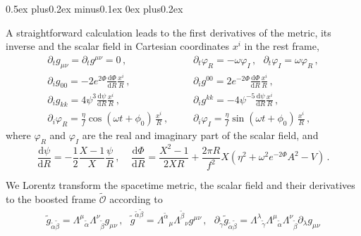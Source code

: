 \documentclass[]{iopart}
\newcommand{\du}{\mathrm{d}}
\begin{document}
\begin{list}{\rm{\bf ()}}{
                
             \parsep0.5ex plus0.2ex minus0.1ex \itemsep0ex plus0.2ex}
  \item A straightforward calculation leads to the first derivatives
  of the metric, its inverse and the scalar field in Cartesian
  coordinates $x^i$ in the rest frame,
  \begin{eqnarray}
    \partial_t g_{\mu\nu}=\partial_t g^{\mu\nu}=0\,,~~~&&
    \partial_t \varphi_R = -\omega \varphi_I\,,~~~
    \partial_t \varphi_I = \omega \varphi_R\,,
    \nonumber \\[5pt]
    \partial_i g_{00} = -2e^{2\Phi}\frac{\du \Phi}{\du R} \frac{x^i}{R}\,,
    ~~~~~&&
    \partial_i g^{00} = 2e^{-2\Phi} \frac{\du \Phi}{\du R}\frac{x^i}{R}\,,
    \nonumber \\[5pt]
    \partial_i g_{kk} = 4\psi^3 \frac{\du \psi}{\du R} \frac{x^i}{R}\,,
    && \partial_i g^{kk} = -4\psi^{-5} \frac{\du \psi}{\du R}
          \frac{x^i}{R}\,,
    \nonumber \\[5pt]
    \partial_i \varphi_R = \frac{\eta}{f} \cos(\omega t + \phi_0)\,
        \frac{x^i}{R}\,,~~~~&&
  \partial_i \varphi_I = \frac{\eta}{f} \sin(\omega t + \phi_0)\,
        \frac{x^i}{R}\,,
  \end{eqnarray}
  where $\varphi_R$ and $\varphi_I$ are the real and imaginary part
  of the scalar field, and
  \begin{equation}
    \frac{\du \psi}{\du R} = -\frac{1}{2}
        \frac{X-1}{X} \frac{\psi}{R}\,,~~~~~
        \displaystyle \frac{\du \Phi}{\du R}=
        \frac{X^2-1}{2XR}+\frac{2\pi R}{f^2}X(\eta^2+\omega^2
        e^{-2\Phi}A^2-V)\,.
  \end{equation}
  \item We Lorentz transform the spacetime metric, the scalar field
  and their derivatives to the boosted frame $\tilde{\mathcal{O}}$
  according to
  \begin{gather}
    \tilde{g}_{\tilde{\alpha}\tilde{\beta}}=
      \Lambda^{\mu}{}_{\tilde{\alpha}}\Lambda^{\nu}{}_{\tilde{\beta}}g_{\mu\nu}
      \,,~~~
    \tilde{g}^{\tilde{\alpha}\tilde{\beta}}=
    \Lambda^{\tilde{\alpha}}{}_{\mu}\Lambda^{\tilde{\beta}}{}_{\nu}g^{\mu\nu}
    \,,~~~
    \partial_{\tilde{\gamma}}\tilde{g}_{\tilde{\alpha}\tilde{\beta}}=
    \Lambda^{\lambda}{}_{\tilde{\gamma}}\Lambda^{\mu}{}_{\tilde{\alpha}}
    \Lambda^{\nu}{}_{\tilde{\beta}}\partial_{\lambda}g_{\mu\nu}

\end{gather}
\end{list}
\end{document}
